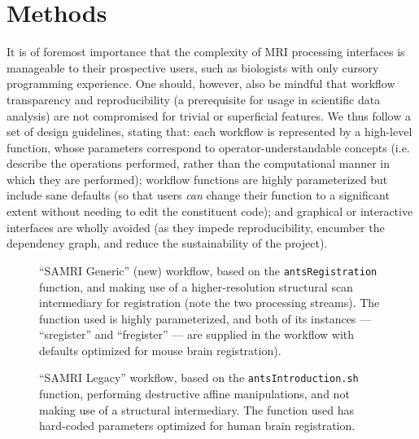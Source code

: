 \section{Methods}
It is of foremost importance that the complexity of MRI processing interfaces is manageable to their prospective users, such as biologists with only cursory programming experience.
One should, however, also be mindful that workflow transparency and reproducibility (a prerequisite for usage in scientific data analysis) are not compromised for trivial or superficial features. 
We thus follow  a set of design guidelines, stating that:
each workflow is represented by a high-level function, whose parameters correspond to operator-understandable concepts (i.e. describe the operations performed, rather than the computational manner in which they are performed); 
workflow functions are highly parameterized but include sane defaults (so that users \textit{can} change their function to a significant extent without needing to edit the constituent code);
and graphical or interactive interfaces are wholly avoided (as they impede reproducibility, encumber the dependency graph, and reduce the sustainability of the project).

\begin{figure*}[h!]
	\begin{subfigure}{.66\textwidth}
		\centering
		\vspace{.55em}
		\caption{
			“SAMRI Generic” (new) workflow, based on the \textcolor{mg}{\texttt{antsRegistration}} function, and  making use of a higher-resolution structural scan intermediary for registration (note the two processing streams).
			The function used is highly parameterized, and both of its instances --- “s\niceus register” and “f\niceus register” --- are supplied in the workflow with defaults optimized for mouse brain registration).
			}
		\label{fig:wfgg}
	\end{subfigure}\hfill
	\begin{subfigure}{.31\textwidth}
		\centering
		\caption{
			“SAMRI Legacy” workflow, based on the \textcolor{mg}{\texttt{antsIntroduction.sh}} function, performing destructive affine manipulations, and not making use of a structural intermediary.
			The function used has hard-coded parameters optimized for human brain registration.
			}
		\label{fig:wfgl}
	\end{subfigure}
	\caption{
		Directed acyclic graphs depicting the two alternate MRI registration workflows and their constituent processing steps.
		The package correspondence of each processing node is appended in parantheses to the node name.
		The “utility” indication corresponds to nodes based on Python functions specific to the workflow, distributed alongside it, and dynamically wrapped via Nipype.
		The “extra\niceus interfaces” indication corresponds to nodes using explicitly defined Nipype-style interfaces, which are specific to the workflow and distributed alongside it.
		}
	\label{fig:wfg}
\end{figure*}

